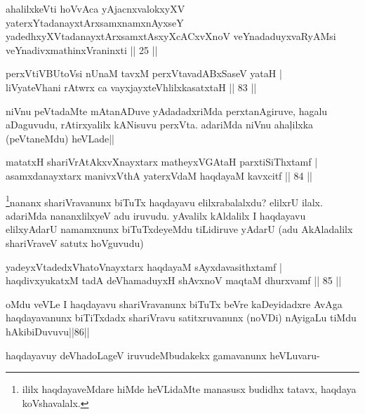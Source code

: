 \begin{shl}
ahalilxkeVti hoVvAca yAjacnxvalokxyXV yaterxYtadanayxtArxsamxnamxnAyxseY yadedhxyXVtadanayxtArxsamxtAsxyXcACxvXnoV veYnadaduyxvaRyAMsi veYnadivxmathinxVraninxti || 25 ||
\end{shl}


\begin{shl}
perxVtiVBUtoV\s si nUnaM tavxM perxVtavadABxSaseV yataH |\\
liVyateV\s hani rAtwrx ca vayxjayxteV\s hlilxkasatxtaH \hfill || 83 ||
\end{shl}

\begin{artha}
niVnu peVtadaMte mAtanADuve yAdadadxriMda perxtanAgiruve, hagalu aDaguvudu, rAtirxyalilx kANisuvu perxVta. adariMda niVnu aha\c lilxka (peVtaneMdu) heVLade||
\end{artha}


\begin{shl}
matatxH shariVrAtAkxvXnayxtarx matheyxVGAtaH parxtiSiThxtamf |\\
asamxdanayxtarx manivxVthA yaterxVdaM haqdayaM kavxcitf \hfill || 84 ||
\end{shl}

\begin{artha}
\footnote[1]{ililx haqdayaveMdare hiMde heVLidaMte manasusx budidhx tatavx, haqdaya koVshavalalx.}nananx shariVravanunx biTuTx haqdayavu elilxrabalalxdu? elilxrU ilalx. adariMda nananxlilxyeV adu iruvudu. yAvalilx kAldalilx I haqdayavu elilxyAdarU namamxnunx biTuTxdeyeMdu tiLidiruve yAdarU (adu AkAladalilx shariVraveV satutx hoVguvudu)
\end{artha}


\begin{shl}
yadeyxVtadedxVhatoV\s nayxtarx haqdayaM sAyxdavasithxtamf |\\
haqdivxyukatxM tadA deVhamaduyxH shAvxnoV maqtaM dhurxvamf \hfill || 85 ||
\end{shl}

\begin{artha}
oMdu veVLe I haqdayavu shariVravanunx biTuTx beVre kaDeyidadxre AvAga haqdayavanunx biTiTxdadx shariVravu satitxruvanunx (noVDi) nAyigaLu tiMdu hAkibiDuvuvu||86||

haqdayavuy deVhadoLageV iruvudeMbudakekx gamavanunx heVLuvaru-
\end{artha}

